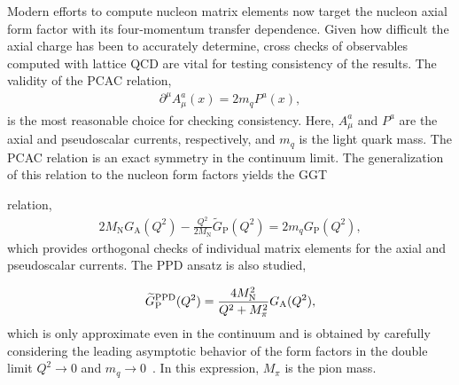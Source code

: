 Modern efforts to compute nucleon matrix elements now target the nucleon
 axial form factor with its four-momentum transfer dependence.
Given how difficult the axial charge has been to accurately determine,
 cross checks of observables computed with lattice QCD are vital
 for testing consistency of the results.
The validity of the PCAC relation,
\begin{align}
 \partial^\mu A^{a}_{\mu}(x) = 2 m_q P^{a}(x),
 \label{eq:pcac}
\end{align}
is the most reasonable choice for checking consistency.
Here, $A^{a}_\mu$ and $P^{a}$ are the axial and pseudoscalar currents,
 respectively, and $m_q$ is the light quark mass.
The PCAC relation is an exact symmetry in the continuum limit.
The generalization of this relation to the nucleon form factors
 yields the GGT%
 \begin{marginnote}
 \end{marginnote}%
 relation,
\begin{align}
 2 M_{\mathrm{N}} G_{\mathrm{A}}(Q^2) -\frac{Q^2}{2M_{\mathrm{N}}} \widetilde{G}_{\mathrm{P}}(Q^2) = 2 m_q G_{\mathrm{P}}(Q^2),
 \label{eq:ggt}
\end{align}
 which provides orthogonal checks of individual matrix elements
 for the axial and pseudoscalar currents.
The PPD ansatz is also studied,%
\begin{marginnote}
 \end{marginnote}%
\begin{align}
 \widetilde{G}^{\rm PPD}_{\mathrm{P}}(Q^2) = \frac{4M_{\mathrm{N}}^2}{Q^2+M_\pi^2} G_{\mathrm{A}}(Q^2),
 \label{eq:ppd}
\end{align}
 which is only approximate even in the continuum and is obtained
 by carefully considering the leading asymptotic behavior of the
 form factors in the double limit $Q^2\to0$ and $m_q\to0$~\cite{Sasaki:2007gw}.
In this expression, $M_\pi$ is the pion mass.

